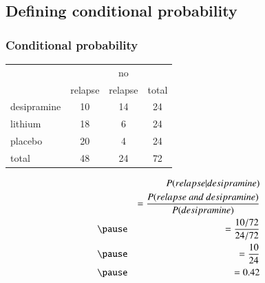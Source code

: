 
\subsection{Defining conditional probability}


\begin{frame}
\frametitle{Conditional probability}


\pause

{
{\small
\begin{center}
\begin{tabular}{l | c c | c}
			& 		& no 		&  \\
			& relapse	& relapse	& total \\
\hline
desipramine	& 10		& 14		& 24 \\
lithium		& 18		& 6		& 24 \\
placebo		& 20		& 4		& 24  \\
\hline
total			& 48		& 24		&  72
\end{tabular}
\end{center}
}
}
{
\begin{eqnarray*}
&&P(relapse |  desipramine) \\
&&= \frac{P(relapse ~ and ~ desipramine)}{P(desipramine)} \\
\pause
&&= \frac{10 / 72}{24 / 72} \\
\pause
&&= \frac{10}{24} \\
\pause
&&= 0.42
\end{eqnarray*}
}

\end{frame}


